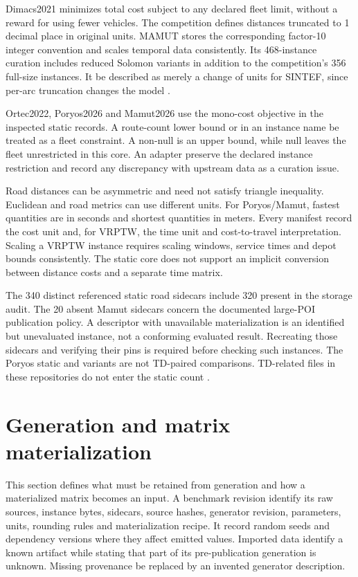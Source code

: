 Dimacs2021 minimizes total cost subject to any declared fleet limit, without a reward for using fewer vehicles. The competition defines distances truncated to 1 decimal place in original units. MAMUT stores the corresponding factor-10 integer convention and scales temporal data consistently. Its 468-instance curation includes reduced Solomon variants in addition to the competition's 356 full-size instances. It \mustnot{} be described as merely a change of units for SINTEF, since per-arc truncation changes the model \autocite{dimacsVRPTWRules2021,onyrStaticStorageAudit2026}.

Ortec2022, Poryos2026 and Mamut2026 use the mono-cost objective in the inspected static records. A route-count lower bound or  in an instance name \mustnot{} be treated as a fleet constraint. A non-null  is an upper bound, while null leaves the fleet unrestricted in this core. An adapter \must{} preserve the declared instance restriction and record any discrepancy with upstream data as a curation issue.

Road distances can be asymmetric and need not satisfy triangle inequality. Euclidean and road metrics can use different units. For Poryos/Mamut, fastest quantities are in seconds and shortest quantities in meters. Every manifest \must{} record the cost unit and, for VRPTW, the time unit and cost-to-travel interpretation. Scaling a VRPTW instance requires scaling windows, service times and depot bounds consistently. The static core does not support an implicit conversion between distance costs and a separate time matrix.

The 340 distinct referenced static road sidecars include 320 present in the storage audit. The 20 absent Mamut sidecars concern the documented large-POI publication policy. A descriptor with unavailable materialization is an identified but unevaluated instance, not a conforming evaluated result. Recreating those sidecars and verifying their pins is required before checking such instances. The Poryos static  and  variants are not TD-paired comparisons. TD-related files in these repositories do not enter the static count \autocite{pichonPoryos2026,pichonMamut2026,onyrStaticStorageAudit2026}.

\section{Generation and matrix materialization}\label{sec:generation}
This section defines what must be retained from generation and how a materialized matrix becomes an input. A benchmark revision \must{} identify its raw sources, instance bytes, sidecars, source hashes, generator revision, parameters, units, rounding rules and materialization recipe. It \must{} record random seeds and dependency versions where they affect emitted values. Imported data \may{} identify a known artifact while stating that part of its pre-publication generation is unknown. Missing provenance \mustnot{} be replaced by an invented generator description.

